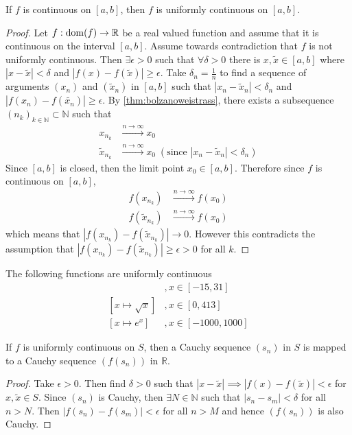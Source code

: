 \documentclass[../notes.tex]{subfiles}
\begin{document}
\begin{theorem}
    \label{thm:closedcontinuityisuniform}
    If $f$ is continuous on $[a,b]$, then $f$ is uniformly continuous on $[a,b]$.
\end{theorem}

\begin{proof}
    Let $f : \operatorname{dom}(f) \to \mathbb{R}$ be a real valued function and assume that it is continuous on the interval $[a,b]$. Assume towards contradiction that $f$ is not uniformly continuous. Then $\exists \epsilon > 0$ such that $\forall\delta > 0$ there is $x, \tilde{x} \in [a,b]$ where $|x - \tilde{x}| < \delta$ and $|f(x) - f(\tilde{x})| \geq \epsilon$. Take $\delta_n = \frac{1}{n}$ to find a sequence of arguments $(x_n)$ and $(\tilde{x}_n)$ in $[a,b]$ such that $|x_n - \tilde{x}_n| < \delta_n$ and $|f(x_n) - f(\tilde{x_n})| \geq \epsilon$. By \ref{thm:bolzanoweistrass}, there exists a subsequence $(n_k)_{k\in \mathbb{N}} \subset \mathbb{N}$ such that
    \begin{align*}
        x_{n_k} &\xrightarrow{n \to \infty} x_0 \\
        \tilde{x}_{n_k} &\xrightarrow{n \to \infty} x_0 \;(\text{since } |x_n - \tilde{x}_n| < \delta_n)
    \end{align*}
    Since $[a,b]$ is closed, then the limit point $x_0 \in [a,b]$. Therefore since $f$ is continuous on $[a,b]$,
    \begin{align*}
        f(x_{n_k}) &\xrightarrow{n \to \infty} f(x_0) \\
        f(\tilde{x}_{n_k}) &\xrightarrow{n \to \infty} f(x_0)
    \end{align*}
    which means that $|f(x_{n_k}) - f(\tilde{x}_{n_k})| \to 0$. However this contradicts the assumption that $|f(x_{n_k}) - f(\tilde{x}_{n_k})| \geq \epsilon > 0$ for all $k$.
\end{proof}

\begin{example}
    The following functions are uniformly continuous
    \begin{align*}
        [x\mapsto x^73]&, x \in [-15, 31] \\
        [x\mapsto \sqrt{x}]&, x\in [0, 413] \\
        [x\mapsto e^x]&, x\in [-1000, 1000]
    \end{align*}
\end{example}

\begin{theorem}
    \label{thm:cauchypreservedunderuniformcontinuity``}
    If $f$ is uniformly continuous on $S$, then a Cauchy sequence $(s_n)$ in $S$ is mapped to a Cauchy sequence $(f(s_n))$ in $\mathbb{R}$.
\end{theorem}
\begin{proof}
    Take $\epsilon >0$. Then find $\delta > 0$ such that $|x - \tilde{x}| \implies |f(x) - f(\tilde{x})| < \epsilon$ for $x,\tilde{x} \in S$. Since $(s_n)$ is Cauchy, then $\exists N \in \mathbb{N}$ such that $|s_n - s_m| < \delta$ for all $n > N$. Then $|f(s_n) - f(s_m)| < \epsilon$ for all $n > M$ and hence $(f(s_n))$ is also Cauchy.
\end{proof}
\end{document}
